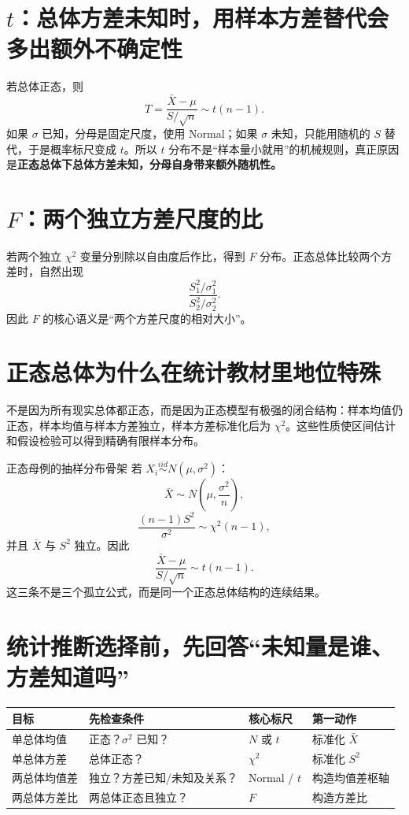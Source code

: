 \documentclass[11pt,a4paper,openany]{ctexbook}
\newcommand{\key}[1]{\textbf{\color{deep}#1}}
\begin{document}
\section{$t$：总体方差未知时，用样本方差替代会多出额外不确定性}
若总体正态，则
\[
T=\frac{\bar X-\mu}{S/\sqrt n}\sim t(n-1).
\]
如果 $\sigma$ 已知，分母是固定尺度，使用 Normal；如果 $\sigma$ 未知，只能用随机的 $S$ 替代，于是概率标尺变成 $t$。所以 $t$ 分布不是“样本量小就用”的机械规则，真正原因是\key{正态总体下总体方差未知，分母自身带来额外随机性。}

\section{$F$：两个独立方差尺度的比}
若两个独立 $\chi^2$ 变量分别除以自由度后作比，得到 $F$ 分布。正态总体比较两个方差时，自然出现
\[
\frac{S_1^2/\sigma_1^2}{S_2^2/\sigma_2^2}.
\]
因此 $F$ 的核心语义是“两个方差尺度的相对大小”。

\section{正态总体为什么在统计教材里地位特殊}
不是因为所有现实总体都正态，而是因为正态模型有极强的闭合结构：样本均值仍正态，样本均值与样本方差独立，样本方差标准化后为 $\chi^2$。这些性质使区间估计和假设检验可以得到精确有限样本分布。

\begin{examplebox}{正态母例的抽样分布骨架}
若 $X_i\overset{iid}{\sim}N(\mu,\sigma^2)$：
\[
\bar X\sim N\left(\mu,\frac{\sigma^2}{n}\right),
\]
\[
\frac{(n-1)S^2}{\sigma^2}\sim\chi^2(n-1),
\]
并且 $\bar X$ 与 $S^2$ 独立。因此
\[
\frac{\bar X-\mu}{S/\sqrt n}\sim t(n-1).
\]
这三条不是三个孤立公式，而是同一个正态总体结构的连续结果。
\end{examplebox}

\section{统计推断选择前，先回答“未知量是谁、方差知道吗”}
\begin{longtable}{L{3.4cm}L{4.2cm}L{4.0cm}L{\dimexpr\linewidth-12.57cm\relax}}
\toprule
\textbf{目标} & \textbf{先检查条件} & \textbf{核心标尺} & \textbf{第一动作}\\
\midrule
单总体均值 & 正态？$\sigma^2$ 已知？ & $N$ 或 $t$ & 标准化 $\bar X$\\
单总体方差 & 总体正态？ & $\chi^2$ & 标准化 $S^2$\\
两总体均值差 & 独立？方差已知/未知及关系？ & Normal / $t$ & 构造均值差枢轴\\
两总体方差比 & 两总体正态且独立？ & $F$ & 构造方差比\\
\bottomrule
\end{longtable}
\end{document}
